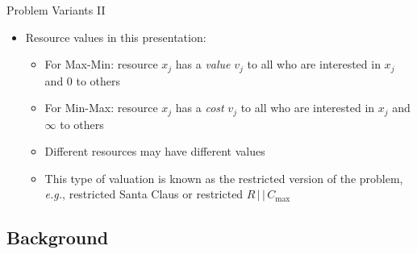 \documentclass[10pt]{beamer}
\begin{document}
\begin{frame}{Problem Variants II}
    \begin{itemize}
		\item<1-> Resource values in this presentation: 
        	\begin{itemize}
            	\item<2-> For Max-Min: resource $x_j$ has a \emph{value} $v_j$ to all who are interested in $x_j$ and $0$ to others
            	\item<3-> For Min-Max: resource $x_j$ has a \emph{cost} $v_j$ to all who are interested in $x_j$ and $\infty$ to others 
                \item<4-> Different resources may have different values
                \item<5-> This type of valuation is known as the \alert{restricted} version of the problem, \emph{e.g.}, \alert{restricted Santa Claus} or \alert{restricted $R \, | \, | \, C_{\max}$}
			\end{itemize}
    \end{itemize}
\end{frame}

\subsection{Background}
\end{document}
